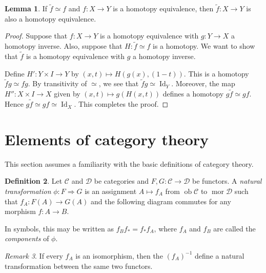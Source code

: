 \documentclass[10pt,letterpaper,cm]{nupset}
\theoremstyle{definition}
\newtheorem{definition}{Definition}[subsection]
\theoremstyle{theorem}
\newtheorem{lemma}[definition]{Lemma}
\theoremstyle{remark}
\newtheorem{remark}[definition]{Remark}
\newcommand{\1}{\mathbf{1}}
\renewcommand{\c}{\mathscr{C}}
\renewcommand{\d}{\mathscr{D}}
\newcommand{\0}{\vec 0}
\DeclareMathOperator{\id}{Id}
\DeclareMathOperator{\ob}{ob}
\DeclareMathOperator{\mor}{mor}
\begin{document}
\begin{lemma}
If $\tilde{f} \simeq f$ and $f: X \to Y$ is a homotopy equivalence, then $\tilde{f} : X \to Y$ is also a homotopy equivalence.
\end{lemma}
\begin{proof}
Suppose that $f: X \to Y$ is a homotopy equivalence with $g: Y \to X$ a homotopy inverse. Also, suppose that $H: \tilde{f} \simeq f$ is a homotopy. We want to show that $\tilde{f}$ is a homotopy equivalence with $g$ a homotopy inverse. 

\medskip

 Define $H' : Y \times I \to Y$ by $(x,t) \mapsto H(g(x), (1-t))$. This is a homotopy $\tilde{f} g \simeq f g$. By transitivity of $\simeq$, we see that $\tilde{f} g  \simeq \id_Y$. Moreover, the map $H'' : X \times I \to X$ given by $(x,t) \mapsto g(H(x,t))$ defines a homotopy $g \tilde{f} \simeq gf$. Hence $g\tilde{f} \simeq gf \simeq \id_X$. This completes the proof.
\end{proof}

\section{Elements of category theory}

This section assumes a familiarity with the basic definitions of category theory.

\begin{definition}
Let $\c$ and $\d$ be categories and $F,G: \c \to \d$ be functors.  A \textit{natural transformation} $\phi :F \Rightarrow G$  is an assignment  $A \mapsto f_A$ from $\ob \c$ to $\mor \d$ such that $f_A : F(A) \to G(A)$ and the following diagram commutes for any morphism $f: A \to B$.

\begin{center}
\end{center}
In symbols, this may be written as $f_Bf_{\ast} = f_{\ast}f_A$, where $f_A$ and $f_B$ are called the \textit{components} of $\phi$.
\end{definition}

\begin{remark}
If every $f_A$ is an isomorphism, then the $(f_A)^{-1}$ define a natural transformation between the same two functors.
\end{remark}
\end{document}
